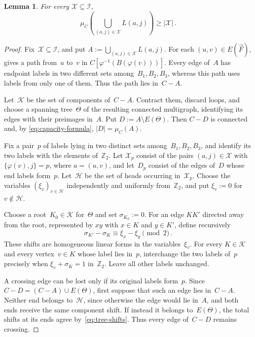 \documentclass[12pt,reqno,a4paper]{amsart}
\newtheorem{lemma}[theorem]{Lemma}
\begin{document}
\begin{lemma}
\label{lem:support-capacity}
  For every $\mathcal X \subseteq \mathcal I$,
  \begin{equation}\label{eq:support-capacity}
    \mu_C \left(\bigcup_{(a,j) \in \mathcal X} L(a,j) \right) \ge |\mathcal X| \, .
  \end{equation}
\end{lemma}
\begin{proof}
  Fix~$\mathcal X \subseteq \mathcal I$, and put $A := \bigcup_{(a,j) \in
  \mathcal X} L(a,j)$.
  For each $(u,v) \in E(\vec F)$,  gives a path from~$u$
  to~$v$ in $C[\varphi^{-1}(B(\varphi(v)))]$. 
  Every edge of~$A$ has endpoint labels in two different sets
  among~$B_1,B_2,B_3$, whereas this path uses labels from only one of them.
  Thus the path lies in~$C-A$.

  Let~$\mathcal K$ be the set of components of~$C-A$. 
  Contract them, discard loops, and choose a spanning tree~$\Theta$ of the
  resulting connected multigraph, identifying its edges with their preimages
  in~$A$.
  Put $D := A \setminus E(\Theta)$.
  Then $C-D$ is connected and, by \eqref{eq:capacity-formula}, $|D| = \mu_C(A)$.

  Fix a pair~$p$ of labels lying in two distinct sets among~$B_1,B_2,B_3$, and
  identify its two labels with the elements of~$\mathbb Z_2$. 
  Let $\mathcal X_p$ consist of the pairs $(a,j) \in \mathcal X$ with
  $\{\varphi(v),j\} = p$, where $a = (u,v)$, and let~$D_p$ consist of the edges
  of~$D$ whose end labels form~$p$.
  Let~$\mathcal H$ be the set of heads occurring in~$\mathcal X_p$.
  Choose the variables $(\xi_v)_{v \in \mathcal H}$ independently and uniformly
  from~$\mathbb Z_2$, and put $\xi_v := 0$ for $v \notin \mathcal H$.

  Choose a root~$K_0 \in \mathcal K$ for~$\Theta$ and set $\sigma_{K_0} := 0$. 
  For an edge $KK'$ directed away from the root, represented by $xy$ with $x
  \in K$ and $y \in K'$, define recursively
  \begin{equation}\label{eq:tree-shifts}
    \sigma_{K'} - \sigma_K \equiv \xi_x - \xi_y \pmod 2 \, .
  \end{equation}
  These shifts are homogeneous linear forms in the variables~$\xi_v$.
  For every $K \in \mathcal K$ and every vertex~$v \in K$ whose label lies
  in~$p$, interchange the two labels of~$p$ precisely when $\xi_v + \sigma_K =
  1$ in~$\mathbb Z_2$.
  Leave all other labels unchanged.

  A crossing edge can be lost only if its original labels form~$p$. 
  Since $C-D = (C-A) \cup E(\Theta)$, first suppose that such an edge lies
  in~$C-A$.
  Neither end belongs to~$\mathcal H$, since otherwise the edge would lie
  in~$A$, and both ends receive the same component shift. 
  If instead it belongs to~$E(\Theta)$, the total shifts at its ends agree
  by~\eqref{eq:tree-shifts}. 
  Thus every edge of~$C-D$ remains crossing.


\end{proof}
\end{document}
